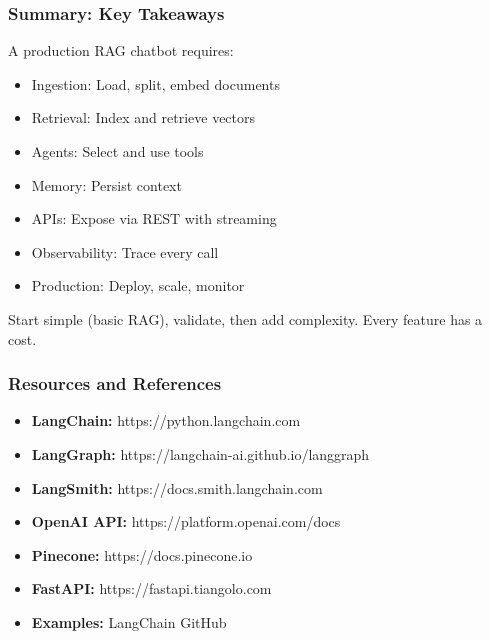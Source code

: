 \documentclass[aspectratio=169,11pt]{beamer}
\begin{document}
\begin{frame}
  \frametitle{Summary: Key Takeaways}

  \begin{conceptbox}
    A production RAG chatbot requires:
    \begin{itemize}
      \item Ingestion: Load, split, embed documents
      \item Retrieval: Index and retrieve vectors
      \item Agents: Select and use tools
      \item Memory: Persist context
      \item APIs: Expose via REST with streaming
      \item Observability: Trace every call
      \item Production: Deploy, scale, monitor
    \end{itemize}
  \end{conceptbox}

  \begin{warningbox}[Remember]
    \small Start simple (basic RAG), validate, then add complexity. Every feature has a cost.
  \end{warningbox}
\end{frame}

\begin{frame}
  \frametitle{Resources and References}

  \begin{itemize}
    \item \textbf{LangChain:} https://python.langchain.com
    \item \textbf{LangGraph:} https://langchain-ai.github.io/langgraph
    \item \textbf{LangSmith:} https://docs.smith.langchain.com
    \item \textbf{OpenAI API:} https://platform.openai.com/docs
    \item \textbf{Pinecone:} https://docs.pinecone.io
    \item \textbf{FastAPI:} https://fastapi.tiangolo.com
    \item \textbf{Examples:} LangChain GitHub
  \end{itemize}
\end{frame}
\end{document}

